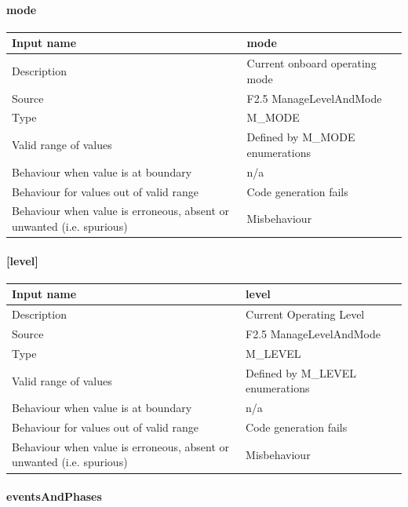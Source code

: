 \paragraph{mode}

\begin{longtable}{p{}p{}}
\toprule
Input name				& mode \\
\midrule
Description				& Current onboard operating mode \\
\midrule
Source					& F2.5 ManageLevelAndMode \\ 
\midrule
Type					& M\_MODE \\
\midrule
Valid range of values	& Defined by M\_MODE enumerations \\
\midrule
Behaviour when value is at boundary	& n/a \\
\midrule
Behaviour for values out of valid range	& Code generation fails \\
\midrule
Behaviour when value is erroneous, absent or unwanted (i.e. spurious) & Misbehaviour \\
\bottomrule
\end{longtable}


\paragraph{[level]}

\begin{longtable}{p{}p{}}
\toprule
Input name				& level \\
\midrule
Description				& Current Operating Level \\
\midrule
Source					& F2.5 ManageLevelAndMode \\ 
\midrule
Type					& M\_LEVEL \\
\midrule
Valid range of values	& Defined by M\_LEVEL enumerations \\
\midrule
Behaviour when value is at boundary	& n/a \\
\midrule
Behaviour for values out of valid range	&  Code generation fails \\
\midrule
Behaviour when value is erroneous, absent or unwanted (i.e. spurious) & Misbehaviour \\
\bottomrule
\end{longtable}

\paragraph{eventsAndPhases}

